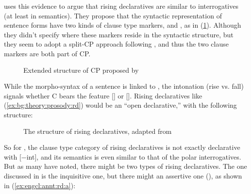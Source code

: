\textcite{farkasroelofsen2017} uses this evidence to argue that rising declaratives are similar to interrogatives (at least in semantics). They propose that the syntactic representation of sentence forms have two kinds of clause type markers,  and , as in (\ref{fig:bg:fb2017}). Although they didn't specify where these markers reside in the syntactic structure, but they seem to adopt a split-CP approach following \textcite{rizzi1997}, and thus the two clause markers are both part of CP. 


\begin{figure}[H]
\begin{center}
\end{center}
\caption{Extended structure of CP proposed by \textcite{farkasroelofsen2017}}
\label{fig:bg:fb2017}
\end{figure}

While the morpho-syntax of a sentence is linked to , the intonation (rise vs. fall) signals whether C bears the feature [] or []. Rising declaratives like (\ref{ex:bg:theory:prosody:rd}) would be an ``open declarative,'' with the following structure:

\begin{figure}[H]
\begin{center}
\end{center}
\caption{The structure of rising declaratives, adapted from \textcite{farkasroelofsen2017}}
\label{fig:bg:fb2017rd}
\end{figure}

So for \textcite{farkasroelofsen2017}, the clause type category of rising declaratives is not exactly declarative with [$-$int], and its semantics is even similar to that of the polar interrogatives. But as many have noted, there might be two types of rising declaratives. The one discussed in \textcite{farkasroelofsen2017} is the inquisitive one, but there might an assertive one (\cite{jeong2018, goodhue2021rd}), as shown in (\ref{ex:engcl:annt:rd:a}):

